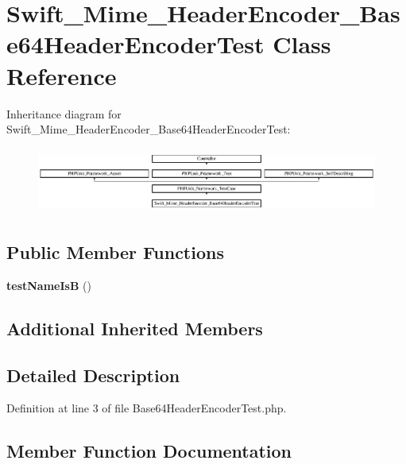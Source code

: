 \section{Swift\+\_\+\+Mime\+\_\+\+Header\+Encoder\+\_\+\+Base64\+Header\+Encoder\+Test Class Reference}
\label{class_swift___mime___header_encoder___base64_header_encoder_test}
Inheritance diagram for Swift\+\_\+\+Mime\+\_\+\+Header\+Encoder\+\_\+\+Base64\+Header\+Encoder\+Test\+:\begin{figure}[H]
\begin{center}
\leavevmode
\includegraphics[height=2.176871cm]{class_swift___mime___header_encoder___base64_header_encoder_test}
\end{center}
\end{figure}
\subsection*{Public Member Functions}
\begin{DoxyCompactItemize}
\item 
{\bf test\+Name\+Is\+B} ()
\end{DoxyCompactItemize}
\subsection*{Additional Inherited Members}


\subsection{Detailed Description}


Definition at line 3 of file Base64\+Header\+Encoder\+Test.\+php.



\subsection{Member Function Documentation}
